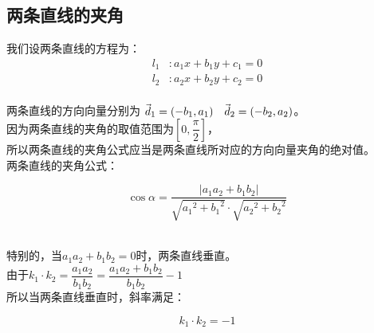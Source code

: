 \documentclass[UTF8]{ctexart}
\let\nvec\vec
\def\vec#1{\nvec{\vphantom b\smash{#1}}}
\begin{document}
\newpage

\subsection{两条直线的夹角}
    我们设两条直线的方程为：
    \begin{align*}
        l_{1}&:a_{1}x+b_{1}y+c_{1}=0\\
        l_{2}&:a_{2}x+b_{2}y+c_{2}=0
    \end{align*}\\
    两条直线的方向向量分别为
    $\vec d_{1} = (-b_{1},a_{1})\quad\vec d_{2} = (-b_{2},a_{2})$。\\[3mm]
    因为两条直线的夹角的取值范围为$[0,\dfrac{\pi}{2}]$，\\[3mm]
    所以两条直线的夹角公式应当是两条直线所对应的方向向量夹角的绝对值。\\[12mm]
    两条直线的夹角公式：
    \begin{large}
        \begin{equation*}
            \cos{\alpha}=\frac{\left|a_{1}a_{2}+b_{1}b_{2}\right|}{\sqrt{{a_{1}}^{2}+{b_{1}}^{2}}\cdot\sqrt{{a_{2}}^{2}+{b_{2}}^{2}}}
        \end{equation*}  
    \end{large}\\
    特别的，当$a_{1}a_{2}+b_{1}b_{2}=0$时，两条直线垂直。\\[12mm]
    由于$k_{1} \cdot k_{2} = \dfrac{a_{1}a_{2}}{b_{1}b_{2}} = \dfrac{a_{1}a_{2}+b_{1}b_{2}}{b_{1}b_{2}}-1$\\[6mm]
    所以当两条直线垂直时，斜率满足：
    \begin{large}
        \begin{equation*}
            k_{1} \cdot k_{2} = -1     
        \end{equation*}
    \end{large}

\newpage
\end{document}

